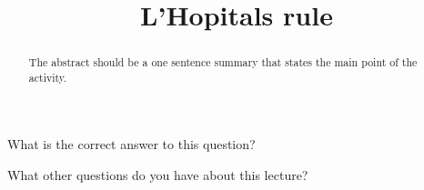 \documentclass{ximera}
\title{L'Hopitals rule}
\begin{document}
\begin{abstract}
  The abstract should be a one sentence summary that states the main point of the activity.
\end{abstract}

\maketitle

\begin{question}
  What is the correct answer to this question?

  \begin{solution}
    \begin{multiple-choice}
    \end{multiple-choice}  
  \end{solution}
\end{question}

What other questions do you have about this lecture?
\begin{free-response}
\end{free-response}
\end{document}
